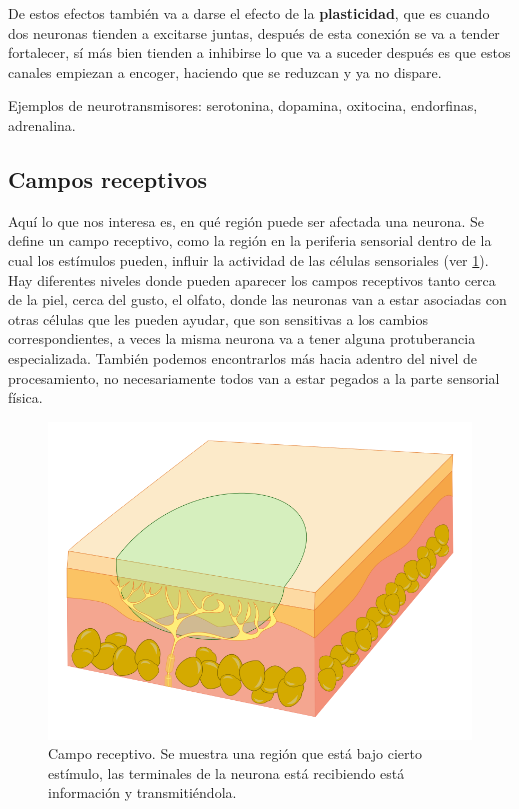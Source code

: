 De estos efectos también va a darse el efecto de la \textbf{plasticidad}, que es cuando dos neuronas tienden a excitarse juntas, después de esta conexión se va a tender fortalecer, sí más bien tienden a inhibirse lo que va a suceder después es que estos canales empiezan a encoger, haciendo que se reduzcan y ya no dispare.


Ejemplos de neurotransmisores: serotonina, dopamina, oxitocina, endorfinas, adrenalina.




\subsection{Campos receptivos}
Aquí lo que nos interesa es, en qué región puede ser afectada una neurona. Se define un campo receptivo, como la región en la periferia sensorial
dentro de la cual los estímulos pueden, influir la actividad de las células sensoriales (ver \ref{fig:camposR}). Hay diferentes niveles donde pueden aparecer los campos receptivos tanto cerca de la piel, cerca del gusto, el olfato, donde las neuronas van a estar asociadas con otras células que les pueden ayudar, que son sensitivas a los cambios correspondientes, a veces la misma neurona va a tener alguna protuberancia especializada.
También podemos encontrarlos más hacia adentro del nivel de procesamiento, no necesariamente todos van a estar pegados a la parte sensorial física. 
\begin{figure}[h]
 \centering
 \includegraphics[scale=0.3]{../Figuras/camposreceptores.png}
 \caption{Campo receptivo. Se muestra una región que está bajo cierto estímulo, las terminales de la neurona está recibiendo está información y transmitiéndola.}
 \label{fig:camposR}
\end{figure}


